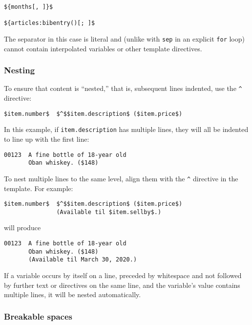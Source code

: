 \documentclass[]{article}
\begin{document}
\begin{verbatim}
${months[, ]}$

${articles:bibentry()[; ]$
\end{verbatim}

The separator in this case is literal and (unlike with \texttt{sep} in
an explicit \texttt{for} loop) cannot contain interpolated variables or
other template directives.

\hypertarget{nesting}{%
\subsubsection{Nesting}\label{nesting}}

To ensure that content is ``nested,'' that is, subsequent lines
indented, use the \texttt{\^{}} directive:

\begin{verbatim}
$item.number$  $^$$item.description$ ($item.price$)
\end{verbatim}

In this example, if \texttt{item.description} has multiple lines, they
will all be indented to line up with the first line:

\begin{verbatim}
00123  A fine bottle of 18-year old
       Oban whiskey. ($148)
\end{verbatim}

To nest multiple lines to the same level, align them with the
\texttt{\^{}} directive in the template. For example:

\begin{verbatim}
$item.number$  $^$$item.description$ ($item.price$)
               (Available til $item.sellby$.)
\end{verbatim}

will produce

\begin{verbatim}
00123  A fine bottle of 18-year old
       Oban whiskey. ($148)
       (Available til March 30, 2020.)
\end{verbatim}

If a variable occurs by itself on a line, preceded by whitespace and not
followed by further text or directives on the same line, and the
variable's value contains multiple lines, it will be nested
automatically.

\hypertarget{breakable-spaces}{%
\subsubsection{Breakable spaces}\label{breakable-spaces}}
\end{document}
